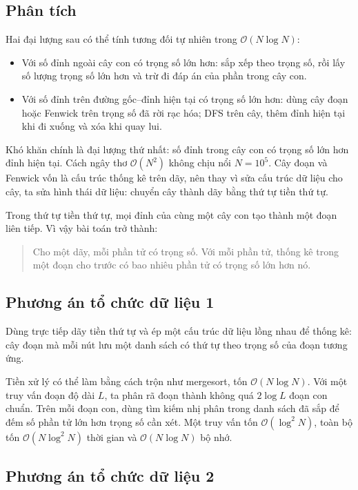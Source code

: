 \documentclass[11pt]{article}
\newcommand{\Oh}{\mathcal{O}}
\begin{document}
\subsection*{Phân tích}

Hai đại lượng sau có thể tính tương đối tự nhiên trong \(\Oh(N\log N)\):
\begin{itemize}
  \item Với số đỉnh ngoài cây con có trọng số lớn hơn: sắp xếp theo trọng số,
  rồi lấy số lượng trọng số lớn hơn và trừ đi đáp án của phần trong cây con.
  \item Với số đỉnh trên đường gốc--đỉnh hiện tại có trọng số lớn hơn: dùng cây
  đoạn hoặc Fenwick trên trọng số đã rời rạc hóa; DFS trên cây, thêm đỉnh hiện
  tại khi đi xuống và xóa khi quay lui.
\end{itemize}

Khó khăn chính là đại lượng thứ nhất: số đỉnh trong cây con có trọng số lớn
hơn đỉnh hiện tại. Cách ngây thơ \(\Oh(N^2)\) không chịu nổi \(N=10^5\). Cây
đoạn và Fenwick vốn là cấu trúc thống kê trên dãy, nên thay vì sửa cấu trúc dữ
liệu cho cây, ta sửa hình thái dữ liệu: chuyển cây thành dãy bằng thứ tự tiền
thứ tự.

Trong thứ tự tiền thứ tự, mọi đỉnh của cùng một cây con tạo thành một đoạn
liên tiếp. Vì vậy bài toán trở thành:

\begin{quote}
Cho một dãy, mỗi phần tử có trọng số. Với mỗi phần tử, thống kê trong một đoạn
cho trước có bao nhiêu phần tử có trọng số lớn hơn nó.
\end{quote}

\subsection*{Phương án tổ chức dữ liệu 1}

Dùng trực tiếp dãy tiền thứ tự và ép một cấu trúc dữ liệu lồng nhau để thống
kê: cây đoạn mà mỗi nút lưu một danh sách có thứ tự theo trọng số của đoạn
tương ứng.

Tiền xử lý có thể làm bằng cách trộn như mergesort, tốn \(\Oh(N\log N)\). Với
một truy vấn đoạn độ dài \(L\), ta phân rã đoạn thành không quá \(2\log L\)
đoạn con chuẩn. Trên mỗi đoạn con, dùng tìm kiếm nhị phân trong danh sách đã
sắp để đếm số phần tử lớn hơn trọng số cần xét. Một truy vấn tốn
\(\Oh(\log^2 N)\), toàn bộ tốn \(\Oh(N\log^2 N)\) thời gian và
\(\Oh(N\log N)\) bộ nhớ.

\subsection*{Phương án tổ chức dữ liệu 2}
\end{document}
